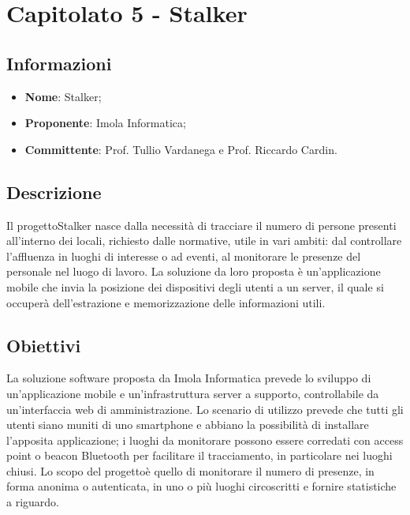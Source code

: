 \section{Capitolato 5 - Stalker}

\subsection{Informazioni}
\begin{itemize}
	\item \textbf{Nome}: Stalker;
	\item \textbf{Proponente}: Imola Informatica;
	\item \textbf{Committente}: Prof. Tullio Vardanega e Prof. Riccardo Cardin.
\end{itemize}

\subsection{Descrizione}
Il progetto\glosp Stalker nasce dalla necessità di tracciare il numero di persone presenti all'interno dei locali, richiesto dalle normative, utile in vari ambiti: dal controllare l'affluenza in luoghi di interesse o ad eventi, al monitorare le presenze del personale nel luogo di lavoro. La soluzione da loro proposta è un'applicazione mobile che invia la posizione dei dispositivi degli utenti a un server, il quale si occuperà dell'estrazione e memorizzazione delle informazioni utili.

\subsection{Obiettivi}
La soluzione software proposta da Imola Informatica prevede lo sviluppo di un'applicazione mobile e un'infrastruttura server a supporto, controllabile da un'interfaccia web di amministrazione. Lo scenario di utilizzo prevede che tutti gli utenti siano muniti di uno smartphone e abbiano la possibilità di installare l'apposita applicazione; i luoghi da monitorare possono essere corredati con access point o beacon Bluetooth per facilitare il tracciamento, in particolare nei luoghi chiusi. Lo scopo del progetto\glosp è quello di monitorare il numero di presenze, in forma anonima o autenticata, in uno o più luoghi circoscritti e fornire statistiche a riguardo.

